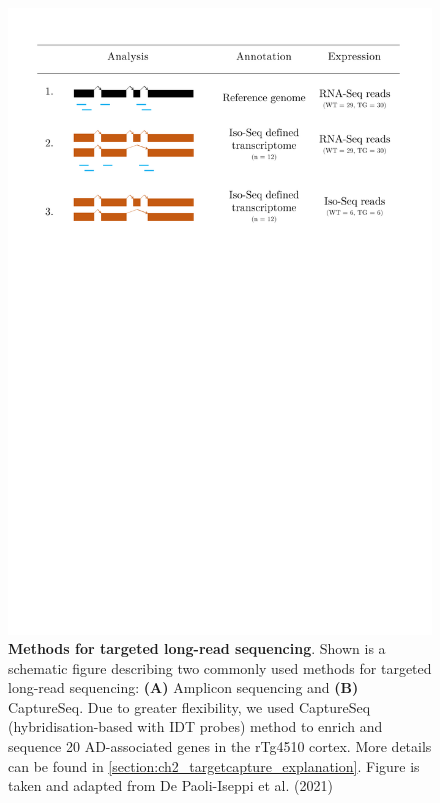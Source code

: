 \begin{figure}[htp]
	\centering
	\includegraphics[page=6,trim={1cm 40cm 1cm 0cm},clip,scale = 0.5]{Figures/Tg4510_diff_figures.pdf}
	\captionsetup{width=0.95\textwidth}
	\caption[Methods for targeted sequencing]%
	{\textbf{Methods for targeted long-read sequencing}. Shown is a schematic figure describing two commonly used methods for targeted long-read sequencing: \textbf{(A)} Amplicon sequencing and \textbf{(B)} CaptureSeq. Due to greater flexibility, we used CaptureSeq (hybridisation-based with IDT probes) method to enrich and sequence 20 AD-associated genes in the rTg4510 cortex. More details can be found in \cref{section:ch2_targetcapture_explanation}. Figure is taken and adapted from De Paoli-Iseppi et al. (2021) \cite{DePaoli-Iseppi2021}}
	\label{fig:targeted_sequencing_method}
\end{figure}

